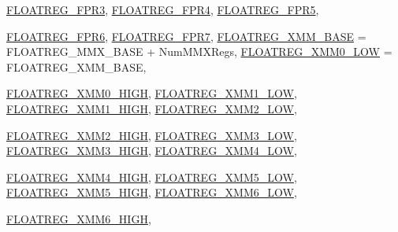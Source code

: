 \begin{DoxyCompactItemize}
\hyperlink{namespaceX86ISA_a50e93c80b4d3e47dea8b60bf4b9a4f77ab0c03e211d665264595c0ba2e9a701fe}{FLOATREG\_\-FPR3}, 
\hyperlink{namespaceX86ISA_a50e93c80b4d3e47dea8b60bf4b9a4f77ae281486cc6f6232734dcaaa6c5c5a7ed}{FLOATREG\_\-FPR4}, 
\hyperlink{namespaceX86ISA_a50e93c80b4d3e47dea8b60bf4b9a4f77ae7eab4b1a157bc525d8bb26ff09b9a6d}{FLOATREG\_\-FPR5}, 
\par
\hyperlink{namespaceX86ISA_a50e93c80b4d3e47dea8b60bf4b9a4f77a1a5c7730afd035a6137869a386f6fe09}{FLOATREG\_\-FPR6}, 
\hyperlink{namespaceX86ISA_a50e93c80b4d3e47dea8b60bf4b9a4f77af55926eb9e075ddeae7dbe7f46fda624}{FLOATREG\_\-FPR7}, 
\hyperlink{namespaceX86ISA_a50e93c80b4d3e47dea8b60bf4b9a4f77ad248439e71b09f0aeb571d7137676b6b}{FLOATREG\_\-XMM\_\-BASE} =  FLOATREG\_\-MMX\_\-BASE + NumMMXRegs, 
\hyperlink{namespaceX86ISA_a50e93c80b4d3e47dea8b60bf4b9a4f77a5d5a0381e330f2dc7e51c2a0448f0b03}{FLOATREG\_\-XMM0\_\-LOW} =  FLOATREG\_\-XMM\_\-BASE, 
\par
\hyperlink{namespaceX86ISA_a50e93c80b4d3e47dea8b60bf4b9a4f77a31aee7c0c4d441fa25893f5f4e24d050}{FLOATREG\_\-XMM0\_\-HIGH}, 
\hyperlink{namespaceX86ISA_a50e93c80b4d3e47dea8b60bf4b9a4f77aa8caa4d58704f00274a423af9e1ab6a6}{FLOATREG\_\-XMM1\_\-LOW}, 
\hyperlink{namespaceX86ISA_a50e93c80b4d3e47dea8b60bf4b9a4f77ab50b763d1ce0eb8ae93aa40c8cba7bc0}{FLOATREG\_\-XMM1\_\-HIGH}, 
\hyperlink{namespaceX86ISA_a50e93c80b4d3e47dea8b60bf4b9a4f77aba6a151cfdbcbedf2e81ae52338b3c48}{FLOATREG\_\-XMM2\_\-LOW}, 
\par
\hyperlink{namespaceX86ISA_a50e93c80b4d3e47dea8b60bf4b9a4f77ad5b6ea6d220ead784941670b58c2e478}{FLOATREG\_\-XMM2\_\-HIGH}, 
\hyperlink{namespaceX86ISA_a50e93c80b4d3e47dea8b60bf4b9a4f77ab1c2d461c178d8a0a2bcdd9aa8e25a47}{FLOATREG\_\-XMM3\_\-LOW}, 
\hyperlink{namespaceX86ISA_a50e93c80b4d3e47dea8b60bf4b9a4f77ac966894f15385e6ba36a21fbeb4f9850}{FLOATREG\_\-XMM3\_\-HIGH}, 
\hyperlink{namespaceX86ISA_a50e93c80b4d3e47dea8b60bf4b9a4f77a55dad5c964ac60383766621dc248dc1c}{FLOATREG\_\-XMM4\_\-LOW}, 
\par
\hyperlink{namespaceX86ISA_a50e93c80b4d3e47dea8b60bf4b9a4f77a8c9e62c9a34af9a0709b3663db50a98e}{FLOATREG\_\-XMM4\_\-HIGH}, 
\hyperlink{namespaceX86ISA_a50e93c80b4d3e47dea8b60bf4b9a4f77a4fb8d895d565e5382f702a0bf8614acb}{FLOATREG\_\-XMM5\_\-LOW}, 
\hyperlink{namespaceX86ISA_a50e93c80b4d3e47dea8b60bf4b9a4f77adf440016146ea9887a5a1f2353fcec0e}{FLOATREG\_\-XMM5\_\-HIGH}, 
\hyperlink{namespaceX86ISA_a50e93c80b4d3e47dea8b60bf4b9a4f77aeb219b742d350c26403d9e71de32457b}{FLOATREG\_\-XMM6\_\-LOW}, 
\par
\hyperlink{namespaceX86ISA_a50e93c80b4d3e47dea8b60bf4b9a4f77ab34166bf309b8c69ae0ed8b4e70c0e20}{FLOATREG\_\-XMM6\_\-HIGH}, 

\end{DoxyCompactItemize}
